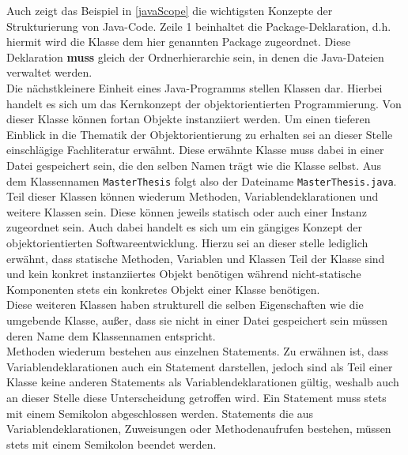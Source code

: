 Auch zeigt das Beispiel in \autoref{javaScope} die wichtigsten Konzepte der Strukturierung von Java-Code. Zeile 1 beinhaltet die Package-Deklaration, d.h. hiermit wird die Klasse dem hier genannten Package zugeordnet. Diese Deklaration \textbf{muss} gleich der Ordnerhierarchie sein, in denen die Java-Dateien verwaltet werden. \\

Die nächstkleinere Einheit eines Java-Programms stellen Klassen dar. Hierbei handelt es sich um das Kernkonzept der objektorientierten Programmierung. Von dieser Klasse können fortan Objekte instanziiert werden. Um einen tieferen Einblick in die Thematik der Objektorientierung zu erhalten sei an dieser Stelle einschlägige Fachliteratur erwähnt. Diese erwähnte Klasse muss dabei in einer Datei gespeichert sein, die den selben Namen trägt wie die Klasse selbst. Aus dem Klassennamen \texttt{MasterThesis} folgt also der Dateiname \texttt{MasterThesis.java}.\\

Teil dieser Klassen können wiederum Methoden, Variablendeklarationen und weitere Klassen sein. Diese können jeweils statisch oder auch einer Instanz zugeordnet sein. Auch dabei handelt es sich um ein gängiges Konzept der objektorientierten Softwareentwicklung. Hierzu sei an dieser stelle lediglich erwähnt, dass statische Methoden, Variablen und Klassen Teil der Klasse sind und kein konkret instanziiertes Objekt benötigen während nicht-statische Komponenten stets ein konkretes Objekt einer Klasse benötigen.\\

Diese weiteren Klassen haben strukturell die selben Eigenschaften wie die umgebende Klasse, außer, dass sie nicht in einer Datei gespeichert sein müssen deren Name dem Klassennamen entspricht.\\



Methoden wiederum bestehen aus einzelnen Statements. Zu erwähnen ist, dass Variablendeklarationen auch ein Statement darstellen, jedoch sind als Teil einer Klasse keine anderen Statements als Variablendeklarationen gültig, weshalb auch an dieser Stelle diese Unterscheidung getroffen wird. Ein Statement muss stets mit einem Semikolon abgeschlossen werden. Statements die aus Variablendeklarationen, Zuweisungen oder Methodenaufrufen bestehen, müssen stets mit einem Semikolon beendet werden. \\


